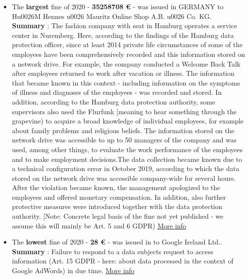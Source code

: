 \documentclass[12pt]{article}
\begin{document}
\newpage
\justify
	\begin{multicols}{2}
	\begin{itemize}
		\item The \textbf{largest} fine of 2020 - \textbf{35258708 €} - was issued in GERMANY to Hu0026M Hennes u0026 Mauritz Online Shop A.B. u0026 Co. KG.
		\newline
		\textbf{Summary} : The fashion company with seat in Hamburg operates a service center in Nuremberg. Here, according to the findings of the Hamburg data protection officer, since at least 2014 private life circumstances of some of the employees have been comprehensively recorded and this information stored on a network drive. For example, the company conducted a Welcome Back Talk after employees returned to work after vacation or illness. The information that became known in this context - including information on the symptoms of illness and diagnoses of the employees - was recorded and stored. In addition, according to the Hamburg data protection authority, some supervisors also used the Flurfunk [meaning to hear something through the grapevine) to acquire a broad knowledge of individual employees, for example about family problems and religious beliefs. The information stored on the network drive was accessible to up to 50 managers of the company and was used, among other things, to evaluate the work performance of the employees and to make employment decisions.The data collection became known due to a technical configuration error in October 2019, according to which the data stored on the network drive was accessible company-wide for several hours. After the violation became known, the management apologized to the employees and offered monetary compensation. In addition, also further protective measures were introduced together with the data protection authority. [Note: Concrete legal basis of the fine not yet published - we assume this will mainly be Art. 5 and 6 GDPR)
		\newline
		\href{https://datenschutz-hamburg.de/pressemitteilungen/2020/10/2020-10-01-h-m-verfahren}{More info}
		\vspace{1cm}
	
		\item The \textbf{lowest} fine of 2020 - \textbf{28 €} - was issued in  to Google Ireland Ltd..
		\newline
		\textbf{Summary} : Failure to respond to a data subjects request to access information (Art. 15 GDPR - here: about data processed in the context of Google AdWords) in due time.
		\newline
		\href{https://www.naih.hu/files/NAIH-2020-5553-hatarozat.pdf}{More info}
	\end{itemize}
	\end{multicols}
\end{document}
